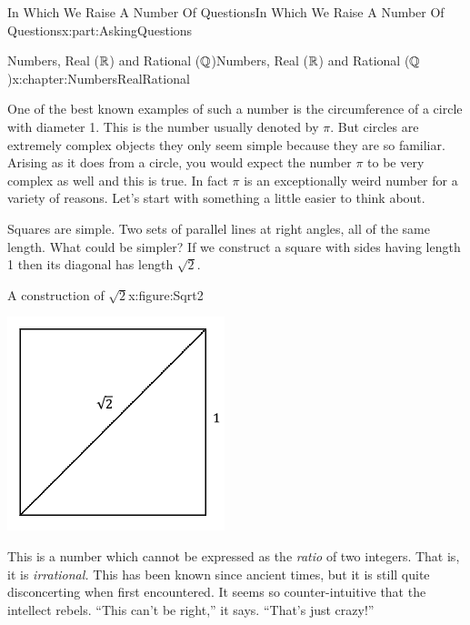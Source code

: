 \begin{partptx}{In Which We Raise A Number Of Questions}{}{In Which We Raise A Number Of Questions}{}{}{x:part:AskingQuestions}
\begin{chapterptx}{Numbers, Real (\(\mathbb {R}\)) and Rational (\(\mathbb {Q}\))}{}{Numbers, Real (\(\mathbb {R}\)) and Rational (\(\mathbb {Q}\))}{}{}{x:chapter:NumbersRealRational}
\begin{introduction}{}
			One of the best known examples of such a number is the circumference of a circle with diameter 1. This is the number usually denoted by \(\pi\). But circles are extremely complex objects \textemdash{} they only seem simple because they are so familiar. Arising as it does from a circle, you would expect the number \(\pi\) to be very complex as well and this is true. In fact \(\pi\) is an exceptionally weird number for a variety of reasons. Let's start with something a little easier to think about.%
			\par
			Squares are simple. Two sets of parallel lines at right angles, all of the same length. What could be simpler? If we construct a square with sides having length 1 then its diagonal has length \(\sqrt{2}\).%
			\begin{figureptx}{A construction of \(\sqrt{2}\)}{x:figure:Sqrt2}{}%
				\begin{image}{0.25}{0.5}{0.25}%
					\includegraphics[width=\linewidth]{external/images/Sqrt2.png}
				\end{image}%
				\tcblower
			\end{figureptx}%
			 This is a number which cannot be expressed as the \emph{ratio} of two integers.  That is, it is \emph{irrational.} This has been known since ancient times, but it is still quite disconcerting when first encountered.  It seems so counter-intuitive that the intellect rebels.  ``This can't be right,'' it says. ``That's just crazy!''%

\end{introduction}
\end{chapterptx}
\end{partptx}
